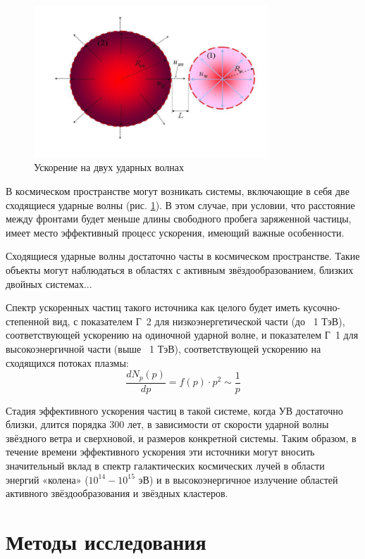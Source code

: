 \documentclass[a4paper,14pt]{extarticle} %
\begin{document}
\begin{figure}[H]
\centering
\includegraphics[width=250pt]{two_shocks}
\caption{Ускорение на двух ударных волнах}
\label{intro/two}
\end{figure}
В космическом пространстве могут возникать системы, включающие в себя две сходящиеся ударные волны (рис. \ref{intro/two}). В этом случае, при условии, что расстояние между фронтами будет меньше длины свободного пробега заряженной частицы, имеет место эффективный процесс ускорения, имеющий важные особенности. \cite{Glad1}\cite{Glad2}\cite{Glad3}

Сходящиеся ударные волны достаточно часты в космическом пространстве. Такие объекты могут наблюдаться в областях с активным звёздообразованием, близких двойных системах...

Спектр ускоренных частиц такого источника как целого будет иметь кусочно-степенной вид, с показателем Г~2 для низкоэнергетической части (до ~1 ТэВ), соответствующей ускорению на одиночной ударной волне, и показателем Г~1 для высокоэнергичной части (выше ~1 ТэВ), соответствующей ускорению на сходящихся потоках плазмы:
\begin{equation}
\frac{dN_p(p)}{dp} = f(p)\cdot p^2 \sim \frac{1}{p}
\end{equation}

Стадия эффективного ускорения частиц в такой системе, когда УВ достаточно близки, длится порядка 300 лет, в зависимости от скорости ударной волны звёздного ветра и сверхновой, и размеров конкретной системы. Таким  образом, в течение времени эффективного ускорения эти источники могут вносить значительный вклад в спектр галактических  космических лучей  в   области  энергий «колена»   ($10^{14} -10^{15}$ эВ) и в высокоэнергичное излучение областей активного звёздообразования и звёздных кластеров.

\section{Методы исследования}
\end{document}
